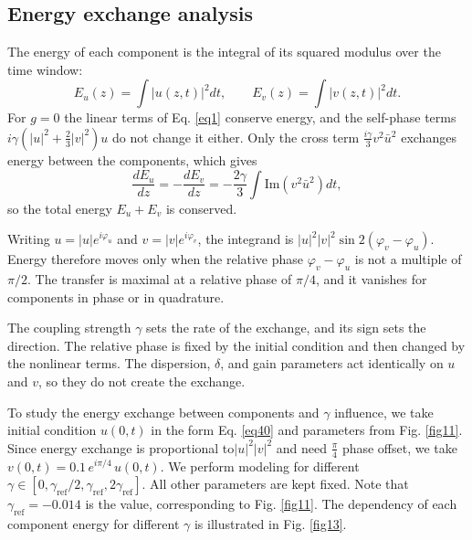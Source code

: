 \documentclass{article}
\begin{document}
    \subsection{Energy exchange analysis}
        The energy of each component is the integral of its squared modulus over the time window:
        \begin{equation} \label{eq63}
            E_{u}(z) = \int \left|u(z,t)\right|^{2} dt, \qquad E_{v}(z) = \int \left|v(z,t)\right|^{2} dt.
        \end{equation}
        For \(g = 0\) the linear terms of Eq. \ref{eq1} conserve energy, and the self-phase terms \(i\gamma\left(\left|u\right|^2+\frac{2}{3}\left|v\right|^2\right)u\) do not change it either. Only the cross term \(\frac{i\gamma}{3}v^{2}\bar{u}^{2}\) exchanges energy between the components, which gives
        \begin{equation} \label{eq64}
            \frac{dE_{u}}{dz} = -\frac{dE_{v}}{dz} = -\frac{2\gamma}{3}\int \mathrm{Im}\left(v^{2}\bar{u}^{2}\right) dt,
        \end{equation}
        so the total energy \(E_{u}+E_{v}\) is conserved.

        Writing \(u = |u|e^{i\varphi_{u}}\) and \(v = |v|e^{i\varphi_{v}}\), the integrand is \(|u|^{2}|v|^{2}\sin 2(\varphi_{v}-\varphi_{u})\). Energy therefore moves only when the relative phase \(\varphi_{v}-\varphi_{u}\) is not a multiple of \(\pi/2\). The transfer is maximal at a relative phase of \(\pi/4\), and it vanishes for components in phase or in quadrature.

        The coupling strength \(\gamma\) sets the rate of the exchange, and its sign sets the direction. The relative phase is fixed by the initial condition and then changed by the nonlinear terms. The dispersion, \(\delta\), and gain parameters act identically on \(u\) and \(v\), so they do not create the exchange.

        To study the energy exchange between components and \(\gamma\) influence, we take initial condition \(u(0,t)\) in the form Eq. \ref{eq40} and parameters from Fig. \ref{fig11}.
        Since energy exchange is proportional to\(|u|^{2}|v|^{2}\) and need \(\frac{\pi}{4}\) phase offset, we take \(v(0,t) = 0.1\,e^{i\pi/4}\,u(0,t)\).
        We perform modeling for different \(\gamma \in \left[0, \gamma_{\mathrm{ref}}/2, \gamma_{\mathrm{ref}}, 2\gamma_{\mathrm{ref}}\right]\). All other parameters are kept fixed. Note that \(\gamma_{\mathrm{ref}} = -0.014\) is the value, corresponding to Fig. \ref{fig11}. The dependency of each component energy for different \(\gamma\) is illustrated in Fig. \ref{fig13}.
\end{document}
